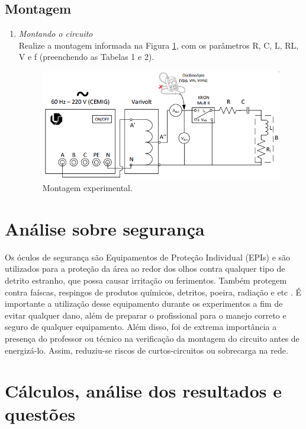 \documentclass[a4paper,12pt,oneside,openany,table,xcdraw]{article}
\begin{document}
\subsection{Montagem} %

\begin{enumerate}[1)]
\item \emph{Montando o circuito}\\
Realize a montagem informada na Figura \ref{fig1}, com os parâmetros R, C, L, RL, V e f (preenchendo as
Tabelas 1 e 2). 

\begin{figure}[H]
\centering
\captionsetup{font=scriptsize}
\includegraphics[width=14.5cm]{fig1}
\caption{Montagem experimental.}
\label{fig1}
\end{figure}

\end{enumerate}

\section{Análise sobre segurança} %
Os óculos de segurança são Equipamentos de Proteção Individual (EPIs) e são utilizados para a proteção da área ao redor dos olhos contra qualquer tipo de detrito estranho, que possa causar irritação ou ferimentos. Também protegem contra faíscas, respingos de produtos químicos, detritos, poeira, radiação e etc \cite{safe}.
É importante a utilização desse equipamento durante os experimentos a fim de evitar qualquer dano, além de preparar o profissional para o manejo correto e seguro de qualquer equipamento.
Além disso, foi de extrema importância a presença do professor ou técnico na verificação da montagem do circuito antes de energizá-lo. Assim, reduziu-se riscos de curtos-circuitos ou sobrecarga na rede.

\section{Cálculos, análise dos resultados e questões} %
\end{document}
